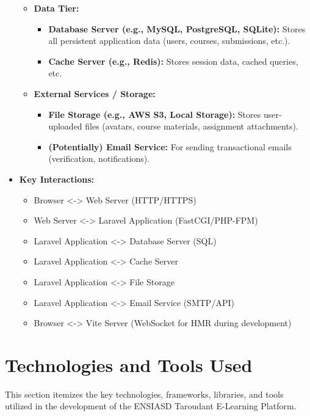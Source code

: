 \begin{itemize}
\begin{itemize}
\begin{itemize}
        \end{itemize}
        \item \textbf{Data Tier:}
        \begin{itemize}
            \item \textbf{Database Server (e.g., MySQL, PostgreSQL, SQLite):} Stores all persistent application data (users, courses, submissions, etc.).
            \item \textbf{Cache Server (e.g., Redis):} Stores session data, cached queries, etc.
        \end{itemize}
        \item \textbf{External Services / Storage:}
        \begin{itemize}
            \item \textbf{File Storage (e.g., AWS S3, Local Storage):} Stores user-uploaded files (avatars, course materials, assignment attachments).
            \item \textbf{(Potentially) Email Service:} For sending transactional emails (verification, notifications).
        \end{itemize}
    \end{itemize}
    \item \textbf{Key Interactions:}
    \begin{itemize}
        \item Browser <-> Web Server (HTTP/HTTPS)
        \item Web Server <-> Laravel Application (FastCGI/PHP-FPM)
        \item Laravel Application <-> Database Server (SQL)
        \item Laravel Application <-> Cache Server
        \item Laravel Application <-> File Storage
        \item Laravel Application <-> Email Service (SMTP/API)
        \item Browser <-> Vite Server (WebSocket for HMR during development)
    \end{itemize}
\end{itemize}

\section*{Technologies and Tools Used}

This section itemizes the key technologies, frameworks, libraries, and tools utilized in the development of the ENSIASD Taroudant E-Learning Platform.

